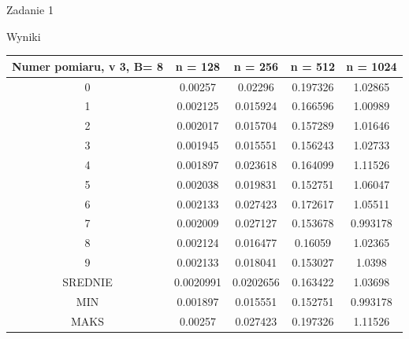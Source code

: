 \documentclass[11pt,wide]{mwart}
\begin{document}
\begin{section}{Zadanie 1}
\begin{subsection}{Wyniki}
\begin{center}
\begin{tabular}{|c|c|c|c|c|}
\hline
Numer pomiaru, v 3, B= 8 & n = 128 & n = 256 & n = 512 & n = 1024\\
\hline
0 & 0.00257 & 0.02296 & 0.197326 & 1.02865\\
\hline
1 & 0.002125 & 0.015924 & 0.166596 & 1.00989\\
\hline
2 & 0.002017 & 0.015704 & 0.157289 & 1.01646\\
\hline
3 & 0.001945 & 0.015551 & 0.156243 & 1.02733\\
\hline
4 & 0.001897 & 0.023618 & 0.164099 & 1.11526\\
\hline
5 & 0.002038 & 0.019831 & 0.152751 & 1.06047\\
\hline
6 & 0.002133 & 0.027423 & 0.172617 & 1.05511\\
\hline
7 & 0.002009 & 0.027127 & 0.153678 & 0.993178\\
\hline
8 & 0.002124 & 0.016477 & 0.16059 & 1.02365\\
\hline
9 & 0.002133 & 0.018041 & 0.153027 & 1.0398\\
\hline
SREDNIE & 0.0020991 & 0.0202656 & 0.163422 & 1.03698\\
\hline
MIN & 0.001897 & 0.015551 & 0.152751 & 0.993178\\
\hline
MAKS & 0.00257 & 0.027423 & 0.197326 & 1.11526\\
\hline
\end{tabular}
\end{center}
   

\end{subsection}
\end{section}
\end{document}
